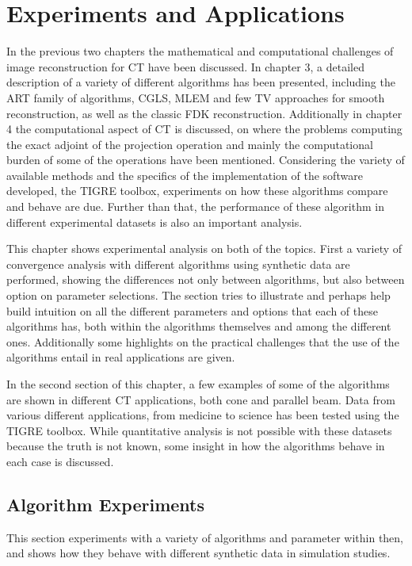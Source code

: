 \chapter{Experiments and Applications}

In the previous two chapters the mathematical and computational challenges of image reconstruction for CT have been discussed. In chapter 3, a detailed description of a variety of different algorithms has been presented, including the ART family of algorithms, CGLS, MLEM and few TV approaches for smooth reconstruction, as well as the classic FDK reconstruction. Additionally in chapter 4 the computational aspect of CT is discussed, on where the problems computing the exact adjoint of the projection operation and mainly the computational burden of some of the operations have been mentioned. Considering the variety of available methods and the specifics of the implementation of the software developed, the TIGRE toolbox, experiments on how these algorithms compare and behave are due. Further than that, the performance of these algorithm in different experimental datasets is also an important analysis.

This chapter shows experimental analysis on both of the topics. First a variety of convergence analysis with different algorithms using synthetic data are performed, showing the differences not only between algorithms, but also between option on parameter selections. The section tries to illustrate and perhaps help build intuition on all the different parameters and options that each of these algorithms has, both within the algorithms themselves and among the different ones. Additionally some highlights on the practical challenges that the use of the algorithms entail in real applications are given.

In the second section of this chapter, a few examples of some of the algorithms are shown in different CT applications, both cone and parallel beam. Data from various different applications, from medicine to science has been tested using the TIGRE toolbox. While quantitative analysis is not possible with these datasets because the truth is not known, some insight in how the algorithms behave in each case is discussed.

\section{Algorithm Experiments}
This section experiments with a variety of algorithms and parameter within then, and shows how they behave with different synthetic data in simulation studies. 

